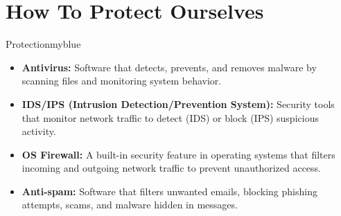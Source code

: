 \vspace{0.75cm}

\section{How To Protect Ourselves}
\begin{prettyBox}{Protection}{myblue}
\begin{itemize}
    \item \textbf{Antivirus:} Software that detects, prevents, and removes 
malware by scanning files and monitoring system behavior.
    \item \textbf{IDS/IPS (Intrusion Detection/Prevention System):} Security 
tools that monitor network traffic to detect (IDS) or block (IPS) suspicious 
activity.
    \item \textbf{OS Firewall:} A built-in security feature in operating 
systems that filters incoming and outgoing network traffic to prevent 
unauthorized access.
    \item \textbf{Anti-spam:} Software that filters unwanted emails, blocking 
phishing attempts, scams, and malware hidden in messages.
\end{itemize}
\end{prettyBox}

